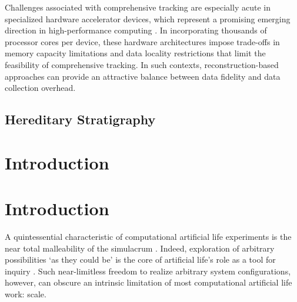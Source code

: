 Challenges associated with comprehensive tracking are especially acute in specialized hardware accelerator devices, which represent a promising emerging direction in high-performance computing \citep{emani2024democratizing}.
In incorporating thousands of processor cores per device, these hardware architectures impose trade-offs in memory capacity limitations and data locality restrictions that limit the feasibility of comprehensive tracking.
In such contexts, reconstruction-based approaches can provide an attractive balance between data fidelity and data collection overhead.

\subsection{Hereditary Stratigraphy} \label{sec:introduction:hstrat}



\section{Introduction} \label{sec:introduction}


\section{Introduction}

A quintessential characteristic of computational artificial life experiments is the near total malleability of the simulacrum \citep{pattee1989simulations}.
Indeed, exploration of arbitrary possibilities `as they could be' is the core of artificial life's role as a tool for inquiry \citep{langton1997artificial}.
Such near-limitless freedom to realize arbitrary system configurations, however, can obscure an intrinsic limitation of most computational artificial life work: scale.

